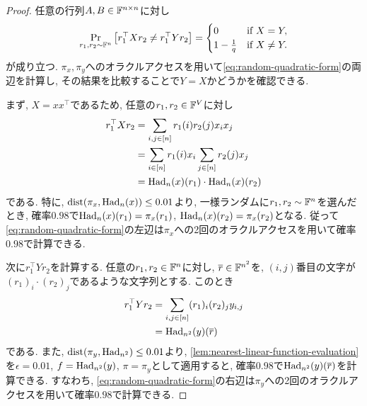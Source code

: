  \begin{proof}
  任意の行列$A,B\in\mathbb{F}^{n\times n}$に対し
  \begin{align}
    \Pr_{r_1,r_2\sim\mathbb{F}^n}\qty[ r_1^\top X r_2 \ne r_1^\top Y r_2 ] =
    \begin{cases}
      0 & \text{if } X=Y,\\
      1-\frac{1}{q} & \text{if } X\ne Y.
    \end{cases} \label{eq:random-quadratic-form}
  \end{align}
  が成り立つ.
  $\pi_x,\pi_y$へのオラクルアクセスを用いて\cref{eq:random-quadratic-form}の両辺を計算し, その結果を比較することで$Y=X$かどうかを確認できる.
  
  まず, $X=xx^\top$であるため, 任意の$r_1,r_2\in\mathbb{F}^V$に対し
  \begin{align*}
    r_1^\top X r_2 &= \sum_{i,j\in [n]} r_1(i) r_2(j) x_i x_j \\
    &= \sum_{i\in [n]} r_1(i) x_i \sum_{j\in [n]} r_2(j) x_j \\
    &= \mathrm{Had}_n(x)(r_1)\cdot \mathrm{Had}_n(x)(r_2)
  \end{align*}
  である. 特に, $\mathrm{dist}(\pi_x,\mathrm{Had}_n(x))\le 0.01$より, 一様ランダムに$r_1,r_2\sim\mathbb{F}^n$を選んだとき, 確率$0.98$で$\mathrm{Had}_n(x)(r_1)=\pi_x(r_1)$, $\mathrm{Had}_n(x)(r_2)=\pi_x(r_2)$となる.
  従って\cref{eq:random-quadratic-form}の左辺は$\pi_x$への2回のオラクルアクセスを用いて確率$0.98$で計算できる.

  次に$r_1^\top Y r_2$を計算する. 任意の$r_1,r_2\in\mathbb{F}^n$に対し, $\overline{r}\in\mathbb{F}^{n^2}$を, $(i,j)$番目の文字が$(r_1)_i\cdot (r_2)_j$であるような文字列とする. このとき
  \begin{align*}
    r_1^\top Y r_2 &= \sum_{i,j\in [n]} (r_1)_i (r_2)_j y_{i,j} \\
    &= \mathrm{Had}_{n^2}(y)(\overline{r})
  \end{align*}
  である. また, $\mathrm{dist}(\pi_y,\mathrm{Had}_{n^2})\le 0.01$より, \cref{lem:nearest-linear-function-evaluation}を$\epsilon=0.01$, $f=\mathrm{Had}_{n^2}(y)$, $\pi=\pi_y$として適用すると, 確率$0.98$で$\mathrm{Had}_{n^2}(y)(\overline{r})$を計算できる.
  すなわち, \cref{eq:random-quadratic-form}の右辺は$\pi_y$への2回のオラクルアクセスを用いて確率$0.98$で計算できる.


\end{proof}
